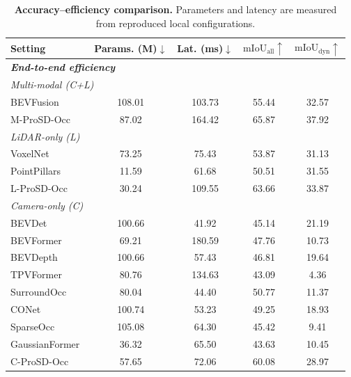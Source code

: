 \begin{table}[!t]
\caption{\textbf{Accuracy--efficiency comparison.} Parameters and latency are measured from reproduced local configurations.}
\label{tab:capacity_efficiency}
\centering
\scriptsize
\setlength{\tabcolsep}{2.1pt}
\renewcommand{\arraystretch}{1.08}
\begin{tabular*}{\columnwidth}{@{\extracolsep{\fill}}lcccc@{}}
\toprule
Setting & Params. (M)$\downarrow$ & Lat. (ms)$\downarrow$ & $\mathrm{mIoU}_{\mathrm{all}}\uparrow$ & $\mathrm{mIoU}_{\mathrm{dyn}}\uparrow$ \\
\midrule
\multicolumn{5}{l}{\textbf{\textit{End-to-end efficiency}}} \\
\multicolumn{5}{l}{\textit{Multi-modal (C+L)}} \\
BEVFusion~\cite{BEVFusion} & 108.01 & 103.73 & 55.44 & 32.57 \\
M-ProSD-Occ & 87.02 & 164.42 & 65.87 & 37.92 \\
\midrule
\multicolumn{5}{l}{\textit{LiDAR-only (L)}} \\
VoxelNet~\cite{VoxelNet} & 73.25 & 75.43 & 53.87 & 31.13 \\
PointPillars~\cite{PointPillars} & 11.59 & 61.68 & 50.51 & 31.55 \\
L-ProSD-Occ & 30.24 & 109.55 & 63.66 & 33.87 \\
\midrule
\multicolumn{5}{l}{\textit{Camera-only (C)}} \\
BEVDet~\cite{BEVDet} & 100.66 & 41.92 & 45.14 & 21.19 \\
BEVFormer~\cite{BEVFormer} & 69.21 & 180.59 & 47.76 & 10.73 \\
BEVDepth~\cite{BEVDepth} & 100.66 & 57.43 & 46.81 & 19.64 \\
TPVFormer~\cite{TPVFormer} & 80.76 & 134.63 & 43.09 & 4.36 \\
SurroundOcc~\cite{SurroundOcc} & 80.04 & 44.40 & 50.77 & 11.37 \\
CONet~\cite{OpenOccupancy} & 100.74 & 53.23 & 49.25 & 18.93 \\
SparseOcc~\cite{SparseOcc} & 105.08 & 64.30 & 45.42 & 9.41 \\
GaussianFormer~\cite{GaussianFormer} & 36.32 & 65.50 & 43.63 & 10.45 \\
C-ProSD-Occ & 57.65 & 72.06 & 60.08 & 28.97 \\
\bottomrule
\end{tabular*}
\end{table}

